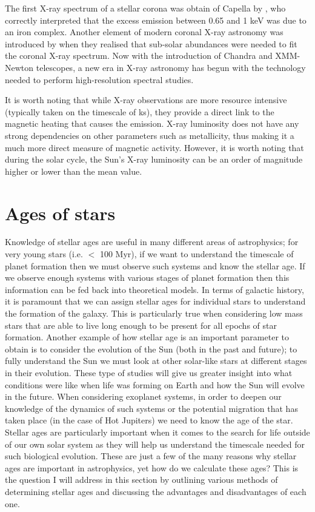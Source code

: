 The first X-ray spectrum of a stellar corona was obtain of Capella by \citet{Cash_etal_1978}, who correctly interpreted that the excess emission between 0.65 and 1 keV was due to an iron complex. Another element of modern coronal X-ray astronomy was introduced by \citet{Walter_etal_1978} when they realised that sub-solar abundances were needed to fit the coronal X-ray spectrum. Now with the introduction of Chandra and XMM-Newton telescopes, a new era in X-ray astronomy has begun with the technology needed to perform high-resolution spectral studies.

It is worth noting that while X-ray observations are more resource intensive (typically taken on the timescale of ks), they provide a direct link to the magnetic heating that causes the emission. X-ray luminosity does not have any strong dependencies on other parameters such as metallicity, thus making it a much more direct measure of magnetic activity. However, it is worth noting that during the solar cycle, the Sun's X-ray luminosity can be an order of magnitude higher or lower than the mean value.


\section{Ages of stars}
\label{Section:intro_ages}
Knowledge of stellar ages are useful in many different areas of astrophysics; for very young stars (i.e. $<$ 100 Myr), if we want to understand the timescale of planet formation then we must observe such systems and know the stellar age. If we observe enough systems with various stages of planet formation then this information can be fed back into theoretical models. In terms of galactic history, it is paramount that we can assign stellar ages for individual stars to understand the formation of the galaxy. This is particularly true when considering low mass stars that are able to live long enough to be present for all epochs of star formation. Another example of how stellar age is an important parameter to obtain is to consider the evolution of the Sun (both in the past and future); to fully understand the Sun we must look at other solar-like stars at different stages in their evolution. These type of studies will give us greater insight into what conditions were like when life was forming on Earth and how the Sun will evolve in the future. When considering exoplanet systems, in order to deepen our knowledge of the dynamics of such systems or the potential migration that has taken place (in the case of Hot Jupiters) we need to know the age of the star. Stellar ages are particularly important when it comes to the search for life outside of our own solar system as they will help us understand the timescale needed for such biological evolution. These are just a few of the many reasons why stellar ages are important in astrophysics, yet how do we calculate these ages? This is the question I will address in this section by outlining various methods of determining stellar ages and discussing the advantages and disadvantages of each one.

